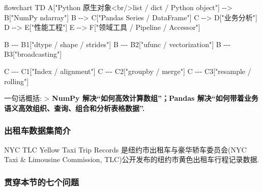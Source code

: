 \documentclass[11pt]{article}
\newenvironment{Shaded}{}{}
\newcommand{\NormalTok}[1]{{#1}}
\begin{document}
\begin{Shaded}
\begin{Highlighting}[]
\NormalTok{flowchart TD}
\NormalTok{    A["Python 原生对象\textless{}br/\textgreater{}list / dict / Python object"] {-}{-}\textgreater{} B["NumPy ndarray"]}
\NormalTok{    B {-}{-}\textgreater{} C["Pandas Series / DataFrame"]}
\NormalTok{    C {-}{-}\textgreater{} D["业务分析"]}
\NormalTok{    D {-}{-}\textgreater{} E["性能工程"]}
\NormalTok{    E {-}{-}\textgreater{} F["领域工具 / Pipeline / Accessor"]}

\NormalTok{    B {-}{-}{-} B1["dtype / shape / strides"]}
\NormalTok{    B {-}{-}{-} B2["ufunc / vectorization"]}
\NormalTok{    B {-}{-}{-} B3["broadcasting"]}

\NormalTok{    C {-}{-}{-} C1["Index / alignment"]}
\NormalTok{    C {-}{-}{-} C2["groupby / merge"]}
\NormalTok{    C {-}{-}{-} C3["resample / rolling"]}
\end{Highlighting}
\end{Shaded}

一句话概括: \textgreater{} \textbf{NumPy
解决``如何高效计算数组''；Pandas
解决``如何带着业务语义高效组织、查询、组合和分析表格数据''. }

\subsubsection{出租车数据集简介}\label{ux51faux79dfux8f66ux6570ux636eux96c6ux7b80ux4ecb}

NYC TLC Yellow Taxi Trip Records 是纽约市出租车与豪华轿车委员会(NYC Taxi
\& Limousine Commission, TLC)公开发布的纽约市黄色出租车行程记录数据.

\subsubsection{贯穿本节的七个问题}\label{ux8d2fux7a7fux672cux8282ux7684ux4e03ux4e2aux95eeux9898}
\end{document}

